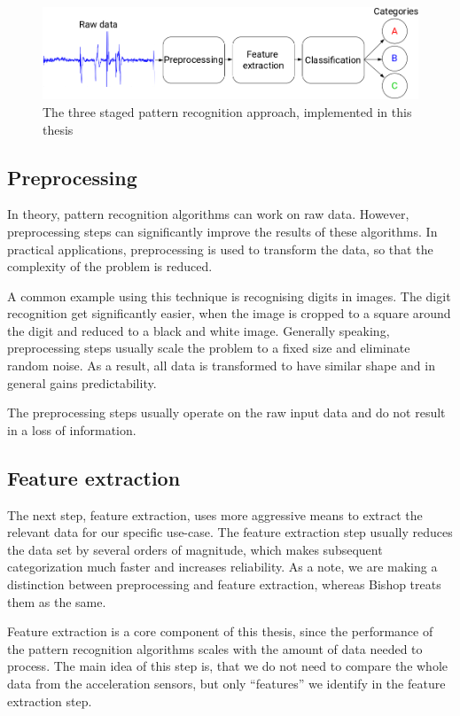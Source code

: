 \begin{figure}
    \centering
    \includegraphics[width=\textwidth]{figures/PatternRecognitionSteps.png}
    \caption{The three staged pattern recognition approach, implemented in this thesis}
    \label{fig:patternrecognitionsteps}
\end{figure}

\subsection{Preprocessing}
In theory, pattern recognition algorithms can work on raw data. However, preprocessing steps can significantly improve the results of these algorithms. In practical applications, preprocessing is used to transform the data, so that the complexity of the problem is reduced. 

A common example using this technique is recognising digits in images. The digit recognition get significantly easier, when the image is cropped to a square around the digit and reduced to a black and white image. Generally speaking, preprocessing steps usually scale the problem to a fixed size and eliminate random noise. As a result, all data is transformed to have similar shape and in general gains predictability.

The preprocessing steps usually operate on the raw input data and do not result in a loss of information.

\subsection{Feature extraction}
The next step, feature extraction, uses more aggressive means to extract the relevant data for our specific use-case. The feature extraction step usually reduces the data set by several orders of magnitude, which makes subsequent categorization much faster and increases reliability. As a note, we are making a distinction between preprocessing and feature extraction, whereas Bishop \cite{bishop2006pattern} treats them as the same.

Feature extraction is a core component of this thesis, since the performance of the pattern recognition algorithms scales with the amount of data needed to process. The main idea of this step is, that we do not need to compare the whole data from the acceleration sensors, but only ``features'' we identify in the feature extraction step.

